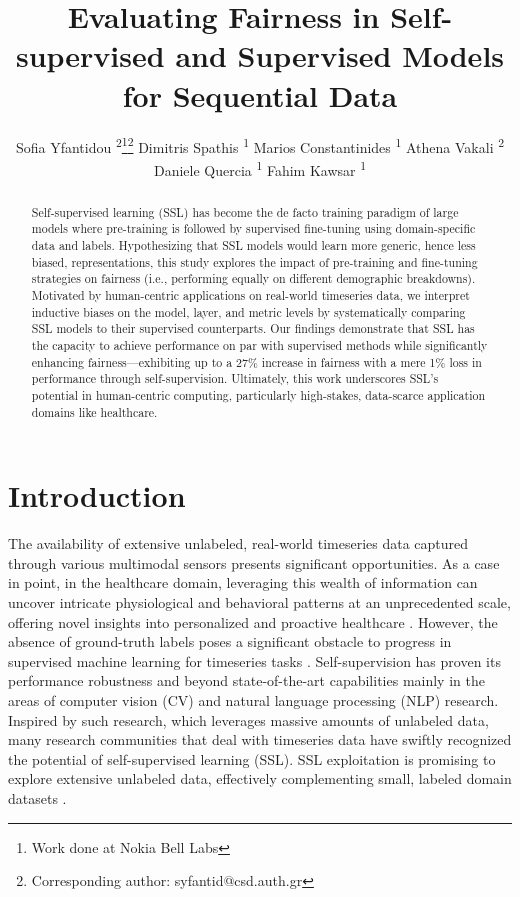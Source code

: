 \documentclass[letterpaper]{article} %
\title{Evaluating Fairness in Self-supervised and Supervised Models for Sequential Data}
\author{
    Sofia Yfantidou \textsuperscript{\rm 2}\thanks{Work done at Nokia Bell Labs}\footnote{Corresponding author: syfantid@csd.auth.gr}
    Dimitris Spathis \textsuperscript{\rm 1}
    Marios Constantinides \textsuperscript{\rm 1}
    Athena Vakali \textsuperscript{\rm 2}
    Daniele Quercia \textsuperscript{\rm 1}
    Fahim Kawsar \textsuperscript{\rm 1}
}
\begin{document}
\maketitle

\begin{abstract}
Self-supervised learning (SSL) has become the de facto training paradigm of large models where pre-training is followed by supervised fine-tuning using domain-specific data and labels.
Hypothesizing that SSL models would learn more generic, hence less biased, representations, this study explores the impact of pre-training and fine-tuning strategies on fairness (i.e., performing equally on different demographic breakdowns).
Motivated by human-centric applications on real-world timeseries data, we interpret inductive biases on the model, layer, and metric levels by systematically comparing SSL models to their supervised counterparts. Our findings demonstrate that SSL has the capacity to achieve performance on par with supervised methods while significantly enhancing fairness---exhibiting up to a 27\% increase in fairness with a mere 1\% loss in performance through self-supervision. Ultimately, this work underscores SSL's potential in human-centric computing, particularly high-stakes, data-scarce application domains like healthcare.
\end{abstract}

\section{Introduction\label{introduction}}
The availability of extensive unlabeled, real-world timeseries data captured through various multimodal sensors presents significant opportunities. As a case in point, in the healthcare domain, leveraging this wealth of information can uncover intricate physiological and behavioral patterns at an unprecedented scale, offering novel insights into personalized and proactive healthcare \cite{perez2021wearables}.
However, the absence of ground-truth labels poses a significant obstacle to progress in supervised machine learning for timeseries tasks \cite{spathis2022breaking}.
Self-supervision has proven its performance robustness and beyond state-of-the-art capabilities mainly in the areas of computer vision (CV) \cite{chen2020simple} and natural language processing (NLP) \cite{devlin2018bert} research. Inspired by such research, which leverages massive amounts of unlabeled data, many research communities that deal with timeseries data have swiftly recognized the potential of self-supervised learning (SSL). SSL exploitation is promising to explore extensive unlabeled data, effectively complementing small, labeled domain datasets \cite{tang2020exploring}.
\end{document}
